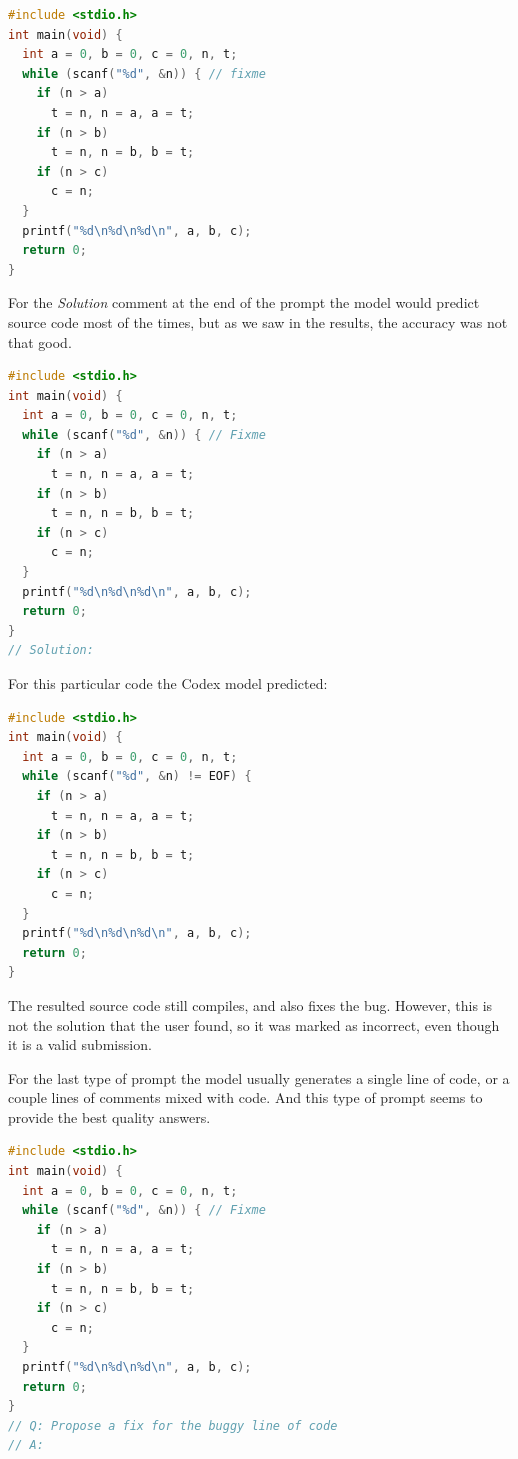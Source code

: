 \documentclass[12pt,a4paper]{report}
\begin{document}
\begin{lstlisting}[language=C++]
#include <stdio.h>
int main(void) {
  int a = 0, b = 0, c = 0, n, t;
  while (scanf("%d", &n)) { // fixme
    if (n > a)
      t = n, n = a, a = t;
    if (n > b)
      t = n, n = b, b = t;
    if (n > c)
      c = n;
  }
  printf("%d\n%d\n%d\n", a, b, c);
  return 0;
}
\end{lstlisting}

For the \textit{Solution} comment at the end of the prompt the model would predict source code most of the times, but as we saw in the results, the accuracy was not that good.

\begin{lstlisting}[language=C++]
#include <stdio.h>
int main(void) {
  int a = 0, b = 0, c = 0, n, t;
  while (scanf("%d", &n)) { // Fixme
    if (n > a)
      t = n, n = a, a = t;
    if (n > b)
      t = n, n = b, b = t;
    if (n > c)
      c = n;
  }
  printf("%d\n%d\n%d\n", a, b, c);
  return 0;
}
// Solution:
\end{lstlisting}

For this particular code the Codex model predicted:

\begin{lstlisting}[language=C++]
#include <stdio.h>
int main(void) {
  int a = 0, b = 0, c = 0, n, t;
  while (scanf("%d", &n) != EOF) {
    if (n > a)
      t = n, n = a, a = t;
    if (n > b)
      t = n, n = b, b = t;
    if (n > c)
      c = n;
  }
  printf("%d\n%d\n%d\n", a, b, c);
  return 0;
}
\end{lstlisting}

The resulted source code still compiles, and also fixes the bug. However, this is not the solution that the user found, so it was marked as incorrect, even though it is a valid submission.

For the last type of prompt the model usually generates a single line of code, or a couple lines of comments mixed with code. And this type of prompt seems to provide the best quality answers.

\begin{lstlisting}[language=C++]
#include <stdio.h>
int main(void) {
  int a = 0, b = 0, c = 0, n, t;
  while (scanf("%d", &n)) { // Fixme
    if (n > a)
      t = n, n = a, a = t;
    if (n > b)
      t = n, n = b, b = t;
    if (n > c)
      c = n;
  }
  printf("%d\n%d\n%d\n", a, b, c);
  return 0;
}
// Q: Propose a fix for the buggy line of code
// A:
\end{lstlisting}
\end{document}
